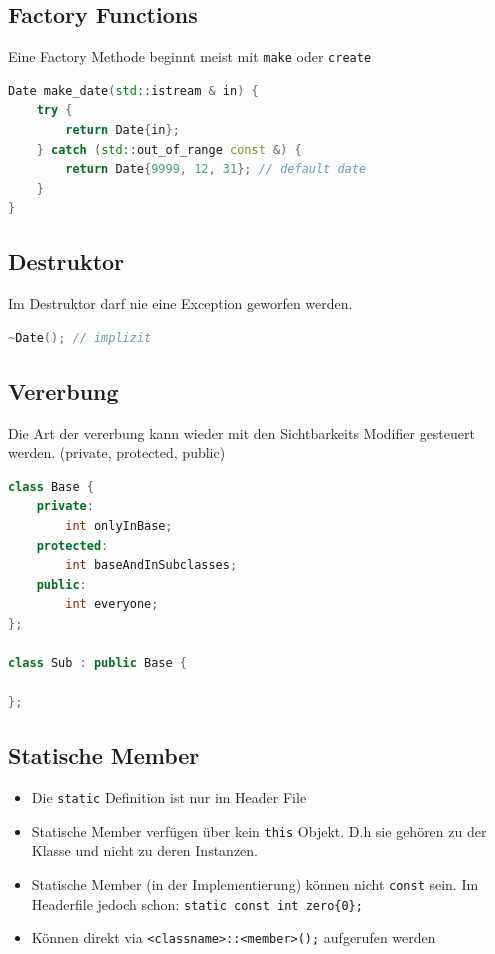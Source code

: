 \subsection{Factory Functions}
Eine Factory Methode beginnt meist mit \lstinline|make| oder \lstinline|create|
\begin{lstlisting}[language=C++, caption=Factory Functions]
Date make_date(std::istream & in) {
	try {
		return Date{in};
	} catch (std::out_of_range const &) {
		return Date{9999, 12, 31}; // default date
	}
}
\end{lstlisting}


\subsection{Destruktor}
Im Destruktor darf nie eine Exception geworfen werden. 
\begin{lstlisting}[language=C++, caption=Destruktor]
	~Date(); // implizit
\end{lstlisting}

\subsection{Vererbung}
Die Art der vererbung kann wieder mit den Sichtbarkeits Modifier gesteuert werden. (private, protected, public)
\begin{lstlisting}[language=C++, caption=Konstruktoren]
class Base { 
	private:
		int onlyInBase;
	protected:
		int baseAndInSubclasses;
	public: 
		int everyone;
};

class Sub : public Base {
	
};
\end{lstlisting}

\subsection{Statische Member}
\begin{itemize}
	\item Die \lstinline|static| Definition ist nur im Header File
	\item Statische Member verfügen über kein \lstinline|this| Objekt. D.h sie gehören zu der Klasse und nicht zu deren Instanzen.
	\item Statische Member (in der Implementierung) können nicht \lstinline|const| sein. Im Headerfile jedoch schon: \lstinline|static const int zero{0};|
	\item Können direkt via \lstinline|<classname>::<member>();| aufgerufen werden
\end{itemize}

